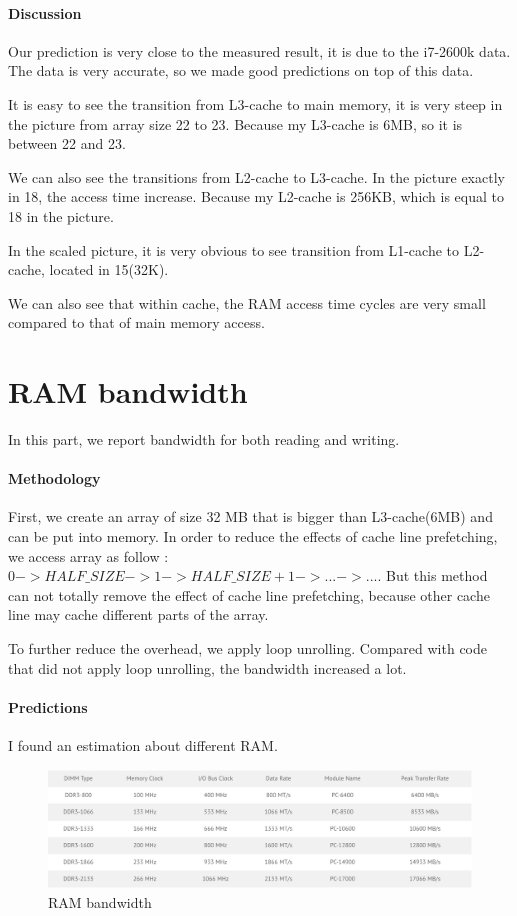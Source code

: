 \paragraph{Discussion}
Our prediction is very close to the measured result, it is due to the i7-2600k data. The data is very accurate, so we made good predictions on top of this data.

It is easy to see the transition from L3-cache to main memory, it is very steep in the picture from array size 22 to 23. Because my L3-cache is 6MB, so it is between 22 and 23.

We can also see the transitions from L2-cache to L3-cache. In the picture exactly in 18, the access time increase. Because my L2-cache is 256KB, which is equal to 18 in the picture.

In the scaled picture, it is very obvious to see transition from L1-cache to L2-cache, located in 15(32K).

We can also see that within cache, the RAM access time cycles are very small compared to that of main memory access.



\section{RAM bandwidth}
In this part, we report bandwidth for both reading and writing.

\paragraph{Methodology}
First, we create an array of size 32 MB that is bigger than L3-cache(6MB) and can be put into memory. In order to reduce the effects of cache line prefetching, we access array as follow : $0 -> HALF\_SIZE -> 1 -> HALF\_SIZE+1 -> ... -> ...$.  But this method can not totally remove the effect of cache line prefetching, because other cache line may cache different parts of the array.

To further reduce the overhead, we apply loop unrolling. Compared with code that did not apply loop unrolling, the bandwidth increased  a lot.

\paragraph{Predictions}

I found an estimation about different RAM\cite{ramref}.

\begin{figure}[!htb]
\centering
\includegraphics[width=6in]{./pics/ram_ref.png}
\caption{RAM bandwidth}\label{RAM bandwidth}
\end{figure}


